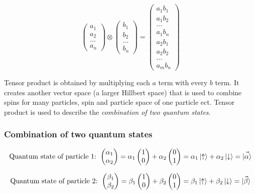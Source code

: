 		$$\begin{pmatrix}a_1\\a_2\\\dots\\a_n\end{pmatrix}\otimes\begin{pmatrix}b_1\\b_2\\\dots\\b_n\end{pmatrix}=\begin{pmatrix}a_1b_1\\a_1b_2\\\dots\\a_1b_n\\a_2b_1\\a_2b_2\\\dots\\a_mb_n\end{pmatrix}$$

		Tensor product is obtained by multiplying each $a$ term with every $b$ term.
		It creates another vector space (a larger Hillbert space) that is used to combine spins for many particles, spin and particle space of one particle ect.
		Tensor product is used to describe the \emph{combination of two quantum states}.

		\subsubsection{Combination of two quantum states}

		$$\text{Quantum state of particle 1: } \begin{pmatrix}\alpha_1\\\alpha_2\end{pmatrix}=\alpha_1\begin{pmatrix}1\\0\end{pmatrix}+\alpha_2\begin{pmatrix}0\\1\end{pmatrix}=\alpha_1\ket{\uparrow}+\alpha_2\ket{\downarrow}=\vec{\ket\alpha}$$

		$$\text{Quantum state of particle 2: } \begin{pmatrix}\beta_1\\\beta_2\end{pmatrix}=\beta_1\begin{pmatrix}1\\0\end{pmatrix}+\beta_2\begin{pmatrix}0\\1\end{pmatrix}=\beta_1\ket{\uparrow}+\beta_2\ket{\downarrow}=\vec{\ket{\beta}}$$

